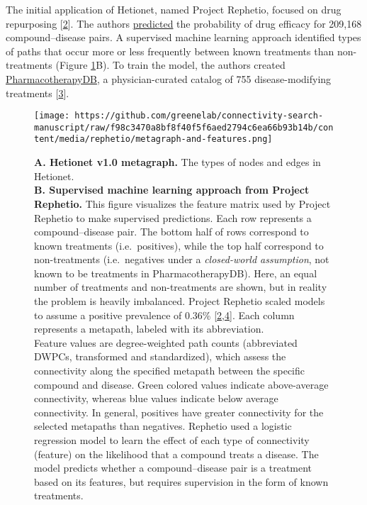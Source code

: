The initial application of Hetionet, named Project Rephetio, focused on drug repurposing {[}\protect\hyperlink{ref-O21tn8vf}{2}{]}.
The authors \href{https://het.io/repurpose/}{predicted} the probability of drug efficacy for 209,168 compound--disease pairs.
A supervised machine learning approach identified types of paths that occur more or less frequently between known treatments than non-treatments (Figure \ref{fig:rephetio}B).
To train the model, the authors created \href{https://doi.org/10.6084/m9.figshare.3103054}{PharmacotherapyDB},
a physician-curated catalog of 755 disease-modifying treatments {[}\protect\hyperlink{ref-5t7pfaPv}{3}{]}.

\begin{figure}
\hypertarget{fig:rephetio}{%
\centering
\texttt{[image: https://github.com/greenelab/connectivity-search-manuscript/raw/f98c3470a8bf8f40f5f6aed2794c6ea66b93b14b/content/media/rephetio/metagraph-and-features.png]}
\caption{\textbf{A. Hetionet v1.0 metagraph.}
The types of nodes and edges in Hetionet.\\
\textbf{B. Supervised machine learning approach from Project Rephetio.}
This figure visualizes the feature matrix used by Project Rephetio to make supervised predictions.
Each row represents a compound--disease pair.
The bottom half of rows correspond to known treatments (i.e.~positives),
while the top half correspond to non-treatments
(i.e.~negatives under a \emph{closed-world assumption}, not known to be treatments in PharmacotherapyDB).
Here, an equal number of treatments and non-treatments are shown, but in reality the problem is heavily imbalanced.
Project Rephetio scaled models to assume a positive prevalence of 0.36\% {[}\protect\hyperlink{ref-O21tn8vf}{2},\protect\hyperlink{ref-vvdoVrc6}{4}{]}.
Each column represents a metapath, labeled with its abbreviation.\\
Feature values are degree-weighted path counts (abbreviated DWPCs, transformed and standardized),
which assess the connectivity along the specified metapath between the specific compound and disease.
Green colored values indicate above-average connectivity,
whereas blue values indicate below average connectivity.
In general, positives have greater connectivity for the selected metapaths than negatives.
Rephetio used a logistic regression model to learn the effect of each type of connectivity (feature) on the likelihood that a compound treats a disease.
The model predicts whether a compound--disease pair is a treatment based on its features,
but requires supervision in the form of known treatments.
}\label{fig:rephetio}
}
\end{figure}

